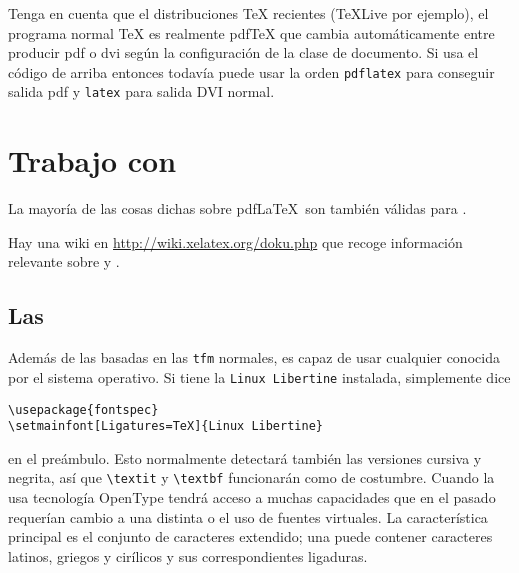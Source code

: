 Tenga en cuenta que el distribuciones \TeX{} recientes (\TeX{}Live por ejemplo), el programa normal \TeX{} es realmente pdf\TeX{} que cambia automáticamente entre producir pdf o dvi según la configuración de la clase de documento.  Si usa el código de arriba entonces todavía puede usar la orden \verb|pdflatex| para conseguir salida pdf y \verb|latex| para salida DVI normal.

\section{Trabajo con }
\label{sec:xetex}

%
La mayoría de las cosas dichas sobre pdf\LaTeX\ son también válidas para .

Hay una wiki en \url{http://wiki.xelatex.org/doku.php} que recoge información
relevante sobre  y .

\subsection{Las \fontsnomo}


Además de las \fontsnomo{} basadas en las \texttt{tfm} normales,  es capaz de usar cualquier \fontnomo{} conocida por el sistema operativo. 
Si tiene la \fontnomo{} \texttt{Linux Libertine} instalada, simplemente dice

\begin{code}
\begin{verbatim}
\usepackage{fontspec}
\setmainfont[Ligatures=TeX]{Linux Libertine}
\end{verbatim}
\end{code}
%
en el preámbulo. Esto normalmente detectará también las versiones cursiva y negrita, así que \verb|\textit| y \verb|\textbf| funcionarán como de costumbre.
Cuando la \fontnomo{} usa tecnología OpenType tendrá acceso a muchas capacidades
que en el pasado requerían cambio a una \fontnomo{} distinta o el uso de fuentes
virtuales. La característica principal es el conjunto de caracteres extendido;
una \fontnomo{} puede contener caracteres latinos, griegos y cirílicos 
y sus correspondientes ligaduras.

